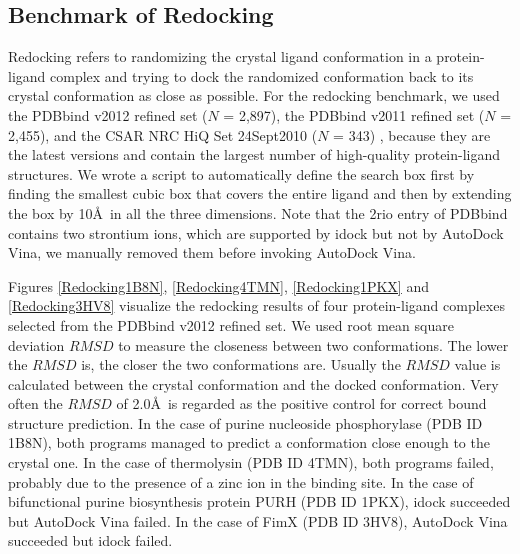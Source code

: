 \documentclass[10pt]{article}
\begin{document}
\subsection*{Benchmark of Redocking}
Redocking refers to randomizing the crystal ligand conformation in a protein-ligand complex and trying to dock the randomized conformation back to its crystal conformation as close as possible. For the redocking benchmark, we used the PDBbind v2012 \cite{529,530} refined set ($N$ = 2,897), the PDBbind v2011 refined set ($N$ = 2,455), and the CSAR NRC HiQ Set 24Sept2010 ($N$ = 343) \cite{857,960}, because they are the latest versions and contain the largest number of high-quality protein-ligand structures. We wrote a script to automatically define the search box first by finding the smallest cubic box that covers the entire ligand and then by extending the box by 10\AA\ in all the three dimensions. Note that the 2rio entry of PDBbind contains two strontium ions, which are supported by idock but not by AutoDock Vina, we manually removed them before invoking AutoDock Vina.

Figures \ref{Redocking1B8N}, \ref{Redocking4TMN}, \ref{Redocking1PKX} and \ref{Redocking3HV8} visualize the redocking results of four protein-ligand complexes selected from the PDBbind v2012 refined set. We used root mean square deviation $RMSD$ to measure the closeness between two conformations. The lower the $RMSD$ is, the closer the two conformations are. Usually the $RMSD$ value is calculated between the crystal conformation and the docked conformation. Very often the $RMSD$ of 2.0\AA\ is regarded as the positive control for correct bound structure prediction. In the case of purine nucleoside phosphorylase (PDB ID 1B8N), both programs managed to predict a conformation close enough to the crystal one. In the case of thermolysin (PDB ID 4TMN), both programs failed, probably due to the presence of a zinc ion in the binding site. In the case of bifunctional purine biosynthesis protein PURH (PDB ID 1PKX), idock succeeded but AutoDock Vina failed. In the case of FimX (PDB ID 3HV8), AutoDock Vina succeeded but idock failed.
\end{document}
